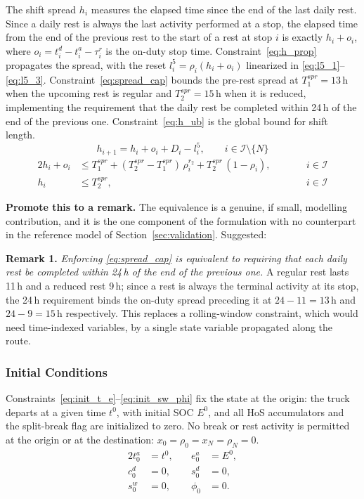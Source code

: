 The shift spread $h_i$ measures the elapsed time since the end of the last daily rest. Since a daily rest is always the last activity performed at a stop, the elapsed time from the end of the previous rest to the start of a rest at stop $i$ is exactly $h_i + o_i$, where $o_i = t^d_i - t^a_i - \tau^r_i$ is the on-duty stop time. Constraint~\eqref{eq:h_prop} propagates the spread, with the reset $l^5_i = \rho_i (h_i + o_i)$ linearized in \eqref{eq:l5_1}--\eqref{eq:l5_3}. Constraint~\eqref{eq:spread_cap} bounds the pre-rest spread at $T^{spr}_1 = 13$\,h when the upcoming rest is regular and $T^{spr}_2 = 15$\,h when it is reduced, implementing the requirement that the daily rest be completed within 24\,h of the end of the previous one. Constraint~\eqref{eq:h_ub} is the global bound for shift length.
\begin{equation}
    h_{i+1} = h_i + o_i + D_i - l^5_i, \qquad i \in \mathcal I \setminus \{N\}
    \label{eq:h_prop}
\end{equation}
\begin{alignat}{2}
    h_i + o_i &\leq T^{spr}_1 + (T^{spr}_2 - T^{spr}_1)\,\rho^{r_2}_i + T^{spr}_2\,(1 - \rho_i), &\qquad& i \in \mathcal I \label{eq:spread_cap}\\
    h_i &\leq T^{spr}_2, &\qquad& i \in \mathcal I \label{eq:h_ub}
\end{alignat}

\begin{anew}
\textbf{Promote this to a remark.} The equivalence is a genuine, if small,
modelling contribution, and it is the one component of the formulation with no
counterpart in the reference model of Section~\ref{sec:validation}. Suggested:

\medskip
\noindent\textbf{Remark 1.} \emph{Enforcing \eqref{eq:spread_cap} is equivalent to
requiring that each daily rest be completed within 24\,h of the end of the
previous one.} A regular rest lasts 11\,h and a reduced rest 9\,h; since a rest is
always the terminal activity at its stop, the 24\,h requirement binds the on-duty
spread preceding it at $24-11 = 13$\,h and $24-9 = 15$\,h respectively. This
replaces a rolling-window constraint, which would need time-indexed variables, by
a single state variable propagated along the route.
\end{anew}

\subsubsection{Initial Conditions}
Constraints~\eqref{eq:init_t_e}--\eqref{eq:init_sw_phi} fix the state at the origin: the truck departs at a given time $t^0$, with initial SOC $E^0$, and all HoS accumulators and the split-break flag are initialized to zero. No break or rest activity is permitted at the origin or at the destination: $x_0 = \rho_0 = x_N = \rho_N = 0$.
\begin{alignat}{2}
    t_0^a &= t^0, &\quad e_0^a &= E^0, \label{eq:init_t_e}\\
    c_0^d &= 0,   &\quad s_0^d &= 0,   \label{eq:init_cd_sd}\\
    s_0^w &= 0,   &\quad \phi_0 &= 0.  \label{eq:init_sw_phi}
\end{alignat}

